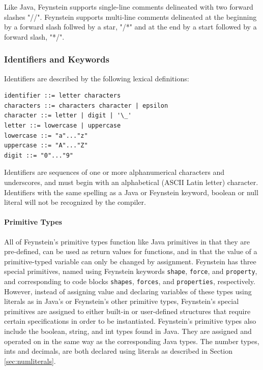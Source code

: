 Like Java, Feynstein supports single-line comments delineated with two
forward slashes "//". Feynstein supports multi-line comments
delineated at the beginning by a forward slash follwed by a star, "/*"
and at the end by a start followed by a forward slash, "*/".
 
\subsubsection{Identifiers and Keywords}

Identifiers are described by the following lexical definitions:

\begin{verbatim}
identifier ::= letter characters
characters ::= characters character | epsilon
character ::= letter | digit | '\_'
letter ::= lowercase | uppercase
lowercase ::= "a"..."z"
uppercase ::= "A"..."Z"
digit ::= "0"..."9"
\end{verbatim}

Identifiers are sequences of one or more alphanumerical characters and
underscores, and must begin with an alphabetical (ASCII Latin letter)
character.  Identifiers with the same spelling as a Java or Feynstein
keyword, boolean or null literal will not be recognized by the
compiler.

\paragraph{Primitive Types}
All of Feynstein's primitive types function like Java primitives in
that they are pre-defined, can be used as return values for functions,
and in that the value of a primitive-typed variable can only be
changed by assignment.  Feynstein has three special primitives, named
using Feynstein keywords \texttt{shape}, \texttt{force}, and \texttt{property}, and
corresponding to code blocks \texttt{shapes}, \texttt{forces}, and \texttt{properties},
respectively.  However, instead of assigning value and declaring
variables of these types using literals as in Java's or Feynstein's
other primitive types, Feynstein's special primitives are assigned to
either built-in or user-defined structures that require certain
specifications in order to be instantiated.  Feynstein's primitive
types also include the boolean, string, and int types found in Java.
They are assigned and operated on in the same way as the corresponding
Java types.  The number types, ints and decimals, are both declared
using literals as described in Section \ref{sec:numliterals}.

